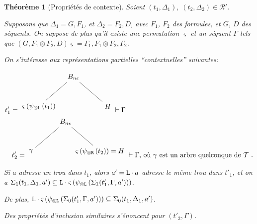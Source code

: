 \documentclass[11pt,a4paper]{article}
\theoremstyle{plain}
\newtheorem{theorem}{Théorème}
\theoremstyle{definition}
\theoremstyle{remark}
\newcommand*{\tensor}{\otimes}
\newcommand*{\permapp}[2]{#2 #1}
\newcommand*{\someperm}{\varsigma}
\newcommand*{\sequent}{\Gamma}
\newcommand*{\sequentbis}{\Delta}
\newcommand*{\Left}{\textnormal{\texttt{L}}}
\newcommand*{\Right}{\textnormal{\texttt{R}}}
\newcommand*{\trees}{\ensuremath{\mathcal{T}}}
\newcommand*{\representationspartial}{\ensuremath{\mathcal{R'}}}
\newcommand*{\unknown}{H}
\newcommand*{\lowapprox}{\ensuremath{\Sigma_0}}
\newcommand*{\highapprox}{\ensuremath{\Sigma_1}}
\begin{document}
\begin{theorem}[Propriétés de contexte]
    \label{context_prop}
    Soient $(t_1, \sequentbis_1), \;  (t_2, \sequentbis_2) \in \representationspartial$. 
    
    Supposons que $\sequentbis_1 = G, F_1$, et $\sequentbis_2 = F_2, D$, avec $F_1$, $F_2$ des formules, et $G$, $D$ des séquents. On suppose de plus qu'il existe une permutation $\someperm$ et un séquent $\sequent$ tels que $\permapp{\someperm}{(G, F_1 \tensor F_2, D)} = \sequent_1, F_1 \tensor F_2, \sequent_2$.

    On s'intéresse aux représentations partielles ``contextuelles'' suivantes:

    \begin{align*}
        \begin{multlined}
            t'_1 = \begin{tikzpicture}%
            [level 1/.style={sibling distance=3.5cm}]
            \node {$B_{n \epsilon}$}
                child {node {$\someperm \left( \psi_{\tensor\Left} \left(
                t_1\right) \right)$}}
                child {node {$\unknown$}
            };
            \end{tikzpicture}
            \vdash \sequent \\
            t'_2 = \begin{tikzpicture}%
            [level 1/.style={sibling distance=3.5cm}]
            \node {$B_{n \epsilon}$}
                child {node {$\gamma$}}
                child {node {$\someperm \left( \psi_{\tensor\Right} \left(t_2\right) \right) = \unknown$}
            };
            \end{tikzpicture}
            \vdash \sequent \text{, où $\gamma$ est un arbre quelconque de $\trees$ }.
        \end{multlined}
    \end{align*}
    
    Si $a$ adresse un trou dans $t_1$, alors $a' = \Left \cdot a$ adresse le même trou dans $t'_1$, et on a $\highapprox(t_1, \sequentbis_1, a') \subseteq \Left \cdot \someperm \left( \psi_{\tensor\Left} \left(\highapprox(t'_1, \sequent, a')\right) \right)$. 
    
    De plus, $\Left \cdot \someperm \left( \psi_{\tensor\Left} \left(\lowapprox(t'_1, \sequent, a')\right) \right) \subseteq \lowapprox(t_1, \sequentbis_1, a')$.
    
    Des propriétés d'inclusion similaires s'énoncent pour $(t'_2, \sequent)$.
\end{theorem}
\end{document}
